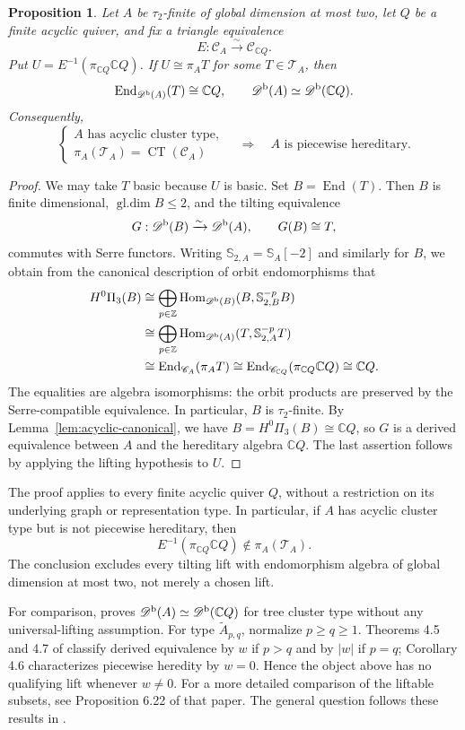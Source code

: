 \documentclass[12pt,a4paper,english,reqno]{amsart}
\theoremstyle{plain}
\newtheorem{prp}[thm]{Proposition}
\theoremstyle{definition}
\numberwithin{equation}{section}
\newcommand{\lemref}[1]{Lemma~\ref{#1}}
\def\ta{\tau}
\def\Hom{\operatorname{Hom}}
\def\End{\operatorname{End}}
\def\Db{{\mathcal D}^{\text{\rm b}}}
\def\calC{{\mathcal C}}
\def\bbZ{{\mathbb Z}}
\def\bbC{{\mathbb C}}
\def\iso{\cong}
\def\Ds{\bigoplus}
\def\ya#1{\xrightarrow{#1}}
\newcommand{\CT}{\operatorname{CT}}
\begin{document}
\begin{prp}\label{prop:acyclic-lifting}
Let $A$ be $\ta_2$-finite of global dimension at most two, let $Q$ be a finite acyclic quiver, and fix a triangle equivalence
\[
 E:\calC_A\ya{\sim}\calC_{\bbC Q}.
\]
Put $U=E^{-1}(\pi_{\bbC Q}\bbC Q)$. If $U\iso\pi_A T$ for some $T\in\mathcal T_A$, then
\[
 \End_{\Db(A)}(T)\iso\bbC Q,\qquad
 \Db(A)\simeq\Db(\bbC Q).
\]
Consequently,
\[
 \left\{
 \begin{array}{l}
 A\text{ has acyclic cluster type},\\
 \pi_A(\mathcal T_A)=\CT(\calC_A)
 \end{array}
 \right.
 \quad\Longrightarrow\quad
 A\text{ is piecewise hereditary}.
\]
\end{prp}
\begin{proof}
We may take $T$ basic because $U$ is basic. Set $B=\End(T)$. Then $B$ is finite dimensional, $\operatorname{gl.dim}B\le2$, and the tilting equivalence
\[
 G:\Db(B)\ya{\sim}\Db(A),\qquad G(B)\iso T,
\]
commutes with Serre functors. Writing $\mathbb S_{2,A}=\mathbb S_A[-2]$ and similarly for $B$, we obtain from the canonical description of orbit endomorphisms that
\begin{align*}
 H^0\Pi_3(B)
 &\iso\Ds_{p\in\bbZ}\Hom_{\Db(B)}(B,\mathbb S_{2,B}^{-p}B)\\
 &\iso\Ds_{p\in\bbZ}\Hom_{\Db(A)}(T,\mathbb S_{2,A}^{-p}T)\\
 &\iso\End_{\calC_A}(\pi_A T)
 \iso\End_{\calC_{\bbC Q}}(\pi_{\bbC Q}\bbC Q)
 \iso\bbC Q.
\end{align*}
The equalities are algebra isomorphisms: the orbit products are preserved by the Serre-compatible equivalence. In particular, $B$ is $\ta_2$-finite. By \lemref{lem:acyclic-canonical}, we have $B=H^0\Pi_3(B)\iso\bbC Q$, so $G$ is a derived equivalence between $A$ and the hereditary algebra $\bbC Q$. The last assertion follows by applying the lifting hypothesis to $U$.
\end{proof}

The proof applies to every finite acyclic quiver $Q$, without a restriction on its underlying graph or representation type. In particular, if $A$ has acyclic cluster type but is not piecewise hereditary, then
\[
 E^{-1}(\pi_{\bbC Q}\bbC Q)\notin\pi_A(\mathcal T_A).
\]
The conclusion excludes every tilting lift with endomorphism algebra of global dimension at most two, not merely a chosen lift.

For comparison, \cite[Corollary 3.16]{AOTree} proves $\Db(A)\simeq\Db(\bbC Q)$ for tree cluster type without any universal-lifting assumption. For type $\widetilde A_{p,q}$, normalize $p\ge q\ge1$. Theorems 4.5 and 4.7 of \cite{AOTree} classify derived equivalence by $w$ if $p>q$ and by $|w|$ if $p=q$; Corollary 4.6 characterizes piecewise heredity by $w=0$. Hence the object above has no qualifying lift whenever $w\ne0$. For a more detailed comparison of the liftable subsets, see Proposition 6.22 of that paper. The general question follows these results in \cite{AOTree}.
\end{document}
